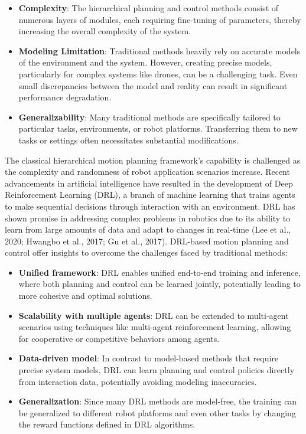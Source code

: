 \begin{itemize}
  \item \textbf{Complexity}: The hierarchical planning and control methods consist of numerous layers of modules, each requiring fine-tuning of parameters, thereby increasing the overall complexity of the system.
  \item \textbf{Modeling Limitation}: Traditional methods heavily rely on accurate models of the environment and the system. However, creating precise models, particularly for complex systems like drones, can be a challenging task. Even small discrepancies between the model and reality can result in significant performance degradation.
  \item \textbf{Generalizability}: Many traditional methods are specifically tailored to particular tasks, environments, or robot platforms. Transferring them to new tasks or settings often necessitates substantial modifications.
\end{itemize}

The classical hierarchical motion planning framework's capability is challenged as the complexity and randomness of robot application scenarios increase. Recent advancements in artificial intelligence have resulted in the development of Deep Reinforcement Learning (DRL), a branch of machine learning that trains agents to make sequential decisions through interaction with an environment. DRL has shown promise in addressing complex problems in robotics due to its ability to learn from large amounts of data and adapt to changes in real-time (Lee et al., 2020; Hwangbo et al., 2017; Gu et al., 2017). DRL-based motion planning and control offer insights to overcome the challenges faced by traditional methods:

\begin{itemize}
  \item \textbf{Unified framework}: DRL enables unified end-to-end training and inference, where both planning and control can be learned jointly, potentially leading to more cohesive and optimal solutions.
  \item \textbf{Scalability with multiple agents}: DRL can be extended to multi-agent scenarios using techniques like multi-agent reinforcement learning, allowing for cooperative or competitive behaviors among agents.
  \item \textbf{Data-driven model}: In contrast to model-based methods that require precise system models, DRL can learn planning and control policies directly from interaction data, potentially avoiding modeling inaccuracies.
  \item \textbf{Generalization}: Since many DRL methods are model-free, the training can be generalized to different robot platforms and even other tasks by changing the reward functions defined in DRL algorithms.
\end{itemize}

